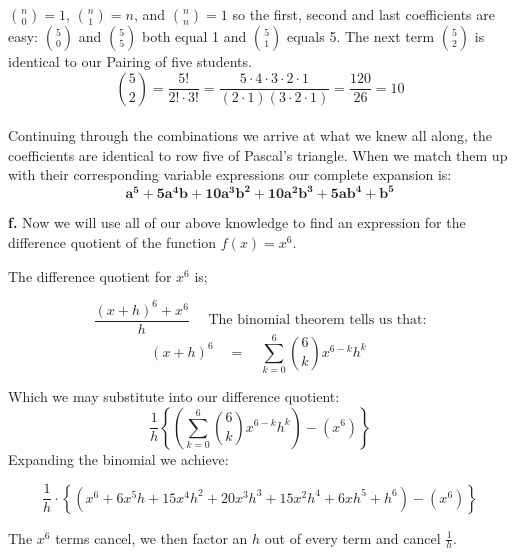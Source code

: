 \documentclass{article}
\begin{document}
{\vspace{2 mm}

$\binom{n}{0}= 1$, $\binom{n}{1}=n$, and $\binom{n}{n}=1$ so the first, second and last coefficients are easy: $\binom{5}{0}$ and $\binom{5}{5} $ both equal 1 and $\binom{5}{1}$ equals 5.
The next term $ \binom{5}{2}$ is identical to our Pairing of five students.\\
\[
 \binom{5}{2}=\frac{5!}{2! \cdot 3!} =\frac{5 \cdot 4 \cdot 3 \cdot 2 \cdot 1}{(2 \cdot 1)(3 \cdot 2 \cdot 1)}=\frac {120}{26} = 10
\]
\vspace{4 mm}\\ 

Continuing through the combinations we arrive at what we knew all along, the coefficients are identical to row five of Pascal's triangle. When we match them up with their corresponding variable expressions our complete expansion is:\\
	\[
	  	\mathbf {a^5  +  5a^4 b  +  10a^3 b^2  +  10a^2 b^3  +  5a b^4  +  b^5}
	\]
	
\vspace{4mm}	
	
{\bfseries f.} Now we will use all of our above knowledge to find an expression for the difference quotient of the function $f(x)=x^6$.\\

\vspace{3 mm}	

The difference quotient for $x^6$ is;

	\[
			\frac{(x + h)^6 +x^6}{h} \quad \text{ The binomial theorem tells us that:} 
	\]
\[
     (x+h)^6\quad=\quad \sum_{k=0}^6 \binom{6}{k} x^{6-k} h^{k} \
\]
\vspace{2 mm}

Which we may substitute into our difference quotient:\\

\[
          \frac{1}{h} \left\{ \left(\sum_{k=0}^6 \binom{6}{k} x^{6-k} h^{k}\right) - (x^6){}\right\}
\]
%
%
Expanding the binomial we achieve:

\vspace{2 mm}

 \[
	\frac{1}{h} \cdot \left\{(x^6 + 6x^5 h + 15x^4 h^2 + 20x^3 h^3 + 15x^2h^4+ 6x h^5 + h^6) - (x^6)\right\}	
\]

\vspace{3 mm}

The $ x^6$ terms cancel, we then factor an $h$ out of every term and cancel $\frac{1}{h}$.\\
			
}
\end{document}
